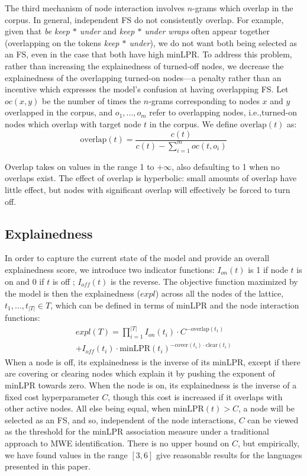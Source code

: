 \documentclass[11pt,letterpaper]{article}
\makeatletter
\def \ie {i.e.,\@ }
\newcommand{\dotts}{...\xspace}
\newcommand{\gap}{$*$\xspace}
\newcommand{\ex}[1]{\textit{#1}\xspace}
\newcommand{\minLPR}{\ensuremath{\text{minLPR}}}
\newcommand{\cover}{\ensuremath{\text{cover}}\xspace}
\newcommand{\clear}{\ensuremath{\text{clear}}\xspace}
\newcommand{\overlap}{\ensuremath{\text{overlap}}\xspace}
\makeatother
\begin{document}
The third mechanism of node interaction involves $n$-grams which overlap in the corpus. In general, independent FS do not consistently overlap. For example, given that \ex{be keep \gap under} and \ex{keep \gap under wraps} often appear together (overlapping on the tokens \ex{keep \gap under}), we do not want both being selected as an FS, even in the case that both have high minLPR. To address this problem, rather than increasing the explainedness of turned-off nodes, we decrease the explainedness of the overlapping turned-on nodes---a penalty rather than an incentive which expresses the model's confusion at having overlapping FS. Let $\mathit{oc}(x,y)$ be the number of times the $n$-grams corresponding to nodes $x$ and $y$ overlapped in the corpus, and $o_1,\dotts,o_m$ refer to overlapping nodes, \ie turned-on nodes which overlap with target node $t$ in the corpus. We define $\overlap(t)$ as:
\begin{displaymath}
	\overlap(t) = \frac{c(t)}{c(t) - \sum_{i=1}^{m}{\mathit{oc}(t,o_i)}}
\end{displaymath}

Overlap takes on values in the range 1 to $+\infty$, also defaulting to 1 when no overlaps exist. The effect of overlap is hyperbolic: small amounts of overlap have little effect, but nodes with significant overlap will effectively be forced to turn off. 

\subsection{Explainedness}

In order to capture the current state of the model and provide an overall explainedness score, we introduce two indicator functions: $I_{\mathit{on}}(t)$ is 1 if node $t$ is on and 0 if $t$ is off ; $I_{\mathit{off}}(t)$ is the reverse. The objective function maximized by the model is then the explainedness ($\mathit{expl}$) across all the nodes of the lattice, $t_1,\dots,t_{|T|} \in T$, which can be defined in terms of minLPR and the node interaction functions:
%
\begin{multline}
	\mathit{expl}(T) = \prod_{i=1}^{|T|}{I_{\mathit{on}}(t_i)\cdot C^{-\overlap(t_1)}} \\ + I_{\mathit{off}}(t_i)\cdot\minLPR(t_i)^{-\cover(t_i) \cdot \clear(t_i)}
\end{multline}
\noindent
When a node is off, its explainedness is the inverse of its minLPR, except if there are covering or clearing nodes which explain it by pushing the exponent of minLPR towards zero. When the node is on, its explainedness is the inverse of a fixed cost hyperparameter $C$, though this cost is increased if it overlaps with other active nodes. 
All else being equal, when $\minLPR(t) > C$, a node will be selected as an FS, and so, independent of the node interactions, $C$ can be viewed as the threshold for the minLPR association measure under a traditional approach to MWE identification. There is no upper bound on $C$, but empirically, we have found values in the range $[3,6]$ give reasonable results for the languages presented in this paper.
\end{document}
